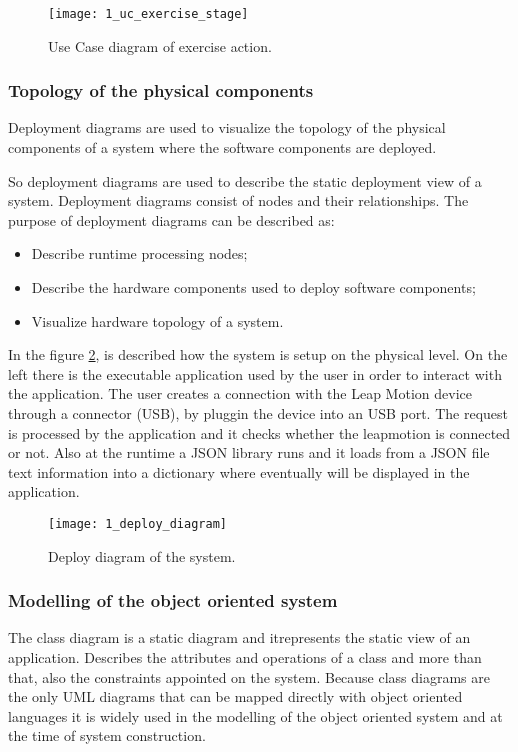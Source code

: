 \begin{figure}[!h]
\centering
\texttt{[image: 1\_uc\_exercise\_stage]}
\caption{Use Case diagram of exercise action.}\label{uc_exercise}
\end{figure}

\subsubsection{Topology of the physical components}
Deployment diagrams are used to visualize the topology of the physical components of a system where the software components are deployed.

So deployment diagrams are used to describe the static deployment view of a system. Deployment diagrams consist of nodes and their relationships. The purpose of deployment diagrams can be described as:
\begin{itemize}
\item Describe runtime processing nodes;
\item Describe the hardware components used to deploy software components;
\item Visualize hardware topology of a system.
\end{itemize}

\vspace{0.2cm}

In the \mbox{figure} \ref{deploy_diagram}, is described how the system is setup on the physical level. On the left there is the executable application used by the user in order to interact with the application. The user creates a connection with the Leap Motion device through a connector (USB), by pluggin the device into an USB port. The request is processed by the application and it checks whether the leapmotion is connected or not. Also at the runtime a JSON library runs and it loads from a JSON file text information into a dictionary where eventually will be displayed in the application.


\begin{figure}[!h]
\centering
\texttt{[image: 1\_deploy\_diagram]}
\caption{Deploy diagram of the system.}\label{deploy_diagram}
\end{figure}


\subsubsection{Modelling of the object oriented system}
The class diagram is a static diagram and itrepresents the static view of an application. Describes the attributes and operations of a class and more than that, also the constraints appointed on the system.
Because class diagrams are the only UML diagrams that can be mapped directly with object oriented languages it is widely used in the modelling of the object oriented system and at the time of system construction.

